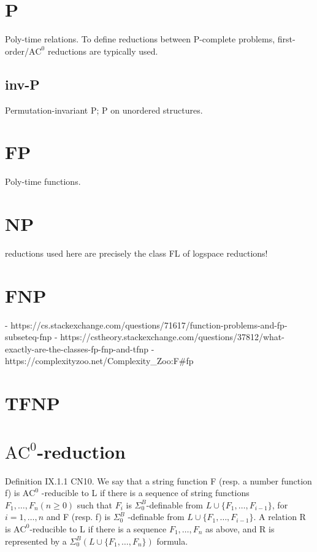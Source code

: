 \section{P}
Poly-time relations. To define reductions between P-complete problems,
first-order/$\text{AC}^0$ reductions are typically used.

\subsection{inv-P}
Permutation-invariant P; P on unordered structures.

\section{FP}
Poly-time functions.

\section{NP}
reductions used here are precisely the class FL of logspace reductions!

\section{FNP}
- https://cs.stackexchange.com/questions/71617/function-problems-and-fp-subseteq-fnp
- https://cstheory.stackexchange.com/questions/37812/what-exactly-are-the-classes-fp-fnp-and-tfnp
- https://complexityzoo.net/Complexity_Zoo:F#fp


\section{TFNP}
\label{sec:complexity-class-tfnp}

\section{\texorpdfstring{$\text{AC}^0$-reduction}{AC\string^0-reduction}}
\label{sec:ac0red}
Definition IX.1.1 CN10. We say that a string function F
(resp. a number function f) is $\text{AC}^0$ -reducible to L if there is a sequence
of string functions $F_1, \dots, F_n (n \geqslant 0)$ such that
$F_i$ is $\Sigma^B_0$-definable from $L \cup \{F_1, \dots , F_{i-1}\}$, for $i = 1, \dots, n$
and F (resp. f) is $\Sigma^B_0$ -definable from $L \cup \{F_1, \dots , F_{i-1}\}$. A relation R is
$\text{AC}^0$-reducible to L if there is a sequence $F_1, \dots, F_n$ as above, and R is
represented by a $\Sigma^B_0(L \cup \{F_1, \dots, F_n\})$ formula.

